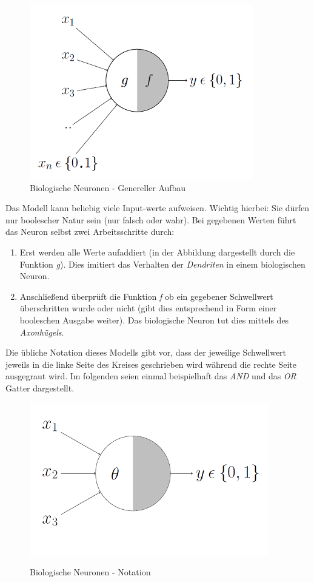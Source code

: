 \begin{figure}[!htb]
	\centering
	\includegraphics[width=.5\linewidth]{img/aufbau}
	\caption{Biologische Neuronen - Genereller Aufbau \cite{mpNeuron}}
	\label{fig:mpn_aufbau}
\end{figure}

Das Modell kann beliebig viele Input-werte aufweisen. Wichtig hierbei: Sie dürfen nur boolescher Natur sein (nur falsch oder wahr). Bei gegebenen Werten führt das Neuron selbst zwei Arbeitsschritte durch: 
\begin{enumerate}

\item Erst werden alle Werte aufaddiert (in der Abbildung dargestellt durch die Funktion \emph{g}). Dies imitiert das Verhalten der \emph{Dendriten} in einem biologischen Neuron. 

\item Anschließend überprüft die Funktion \emph{f} ob ein gegebener Schwellwert überschritten wurde oder nicht (gibt dies entsprechend in Form einer booleschen Ausgabe weiter). Das biologische Neuron tut dies mittels des \emph{Axonhügels}. 

\end{enumerate}

Die übliche Notation dieses Modells gibt vor, dass der jeweilige Schwellwert jeweils in die linke Seite des Kreises geschrieben wird während die rechte Seite ausgegraut wird. Im folgenden seien einmal beispielhaft das \emph{AND} und das \emph{OR} Gatter dargestellt. 

\begin{figure}[!htb]
	\centering
	\href{http://commons.wikimedia.org/wiki/File:Pachydyptes_ponderosus.jpg}{
		\includegraphics[width=.5\linewidth]{img/aufbau2}
	}
	\caption{Biologische Neuronen - Notation}{\cite{mpNeuron}}
	\label{fig:mpn_notation}
\end{figure}

